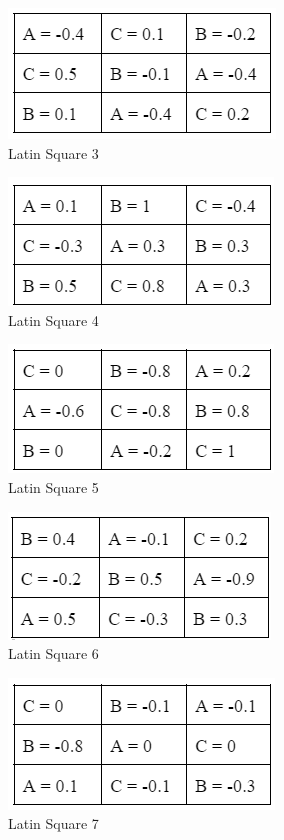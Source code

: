 \documentclass[11pt,a4paper,twoside]{tau-book}
\begin{document}
\begin{figure}[H]
        \centering
    \includegraphics[width=0.5\columnwidth]{Figures/latin square 3.png}
        \caption{Latin Square 3}
        \label{fig:Latin Square 3}
\end{figure}
\newpage
\begin{figure}[H]
        \centering
    \includegraphics[width=0.5\columnwidth]{Figures/latin square 4.png}
        \caption{Latin Square 4}
        \label{fig:Latin Square 4}
\end{figure}

\begin{figure}[H]
        \centering
    \includegraphics[width=0.5\columnwidth]{Figures/latin square 5.png}
        \caption{Latin Square 5}
        \label{fig:Latin Square 5}
\end{figure}

\begin{figure}[H]
        \centering
    \includegraphics[width=0.5\columnwidth]{Figures/latin square 6.png}
        \caption{Latin Square 6}
        \label{fig:Latin Square 6}
\end{figure}

\begin{figure}[H]
        \centering
    \includegraphics[width=0.5\columnwidth]{Figures/latin square 7.png}
        \caption{Latin Square 7}
        \label{fig:Latin Square 7}
\end{figure}
\end{document}
